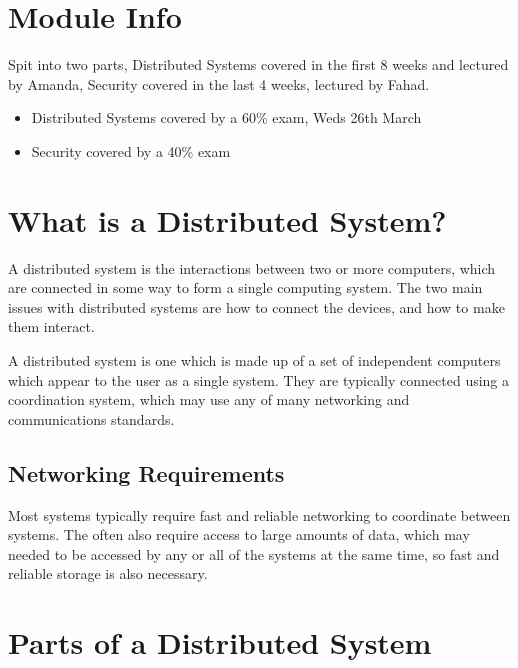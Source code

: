 
\section*{Module Info}

Spit into two parts, Distributed Systems covered in the first 8 weeks and lectured by Amanda, Security covered in the last 4 weeks, lectured by Fahad.

\begin{itemize}
  \item Distributed Systems covered by a 60\% exam, Weds 26th March
  \item Security covered by a 40\% exam
\end{itemize}


\section*{What is a Distributed System?}

A distributed system is the interactions between two or more computers, which are connected in some way to form a single computing system. The two main issues with distributed systems are how to connect the devices, and how to make them interact.

\begin{definition*}{}{}
  A distributed system is one which is made up of a set of independent computers which appear to the user as a single system. They are typically connected using a coordination system, which may use any of many networking and communications standards.
\end{definition*}

\subsection*{Networking Requirements}

Most systems typically require fast and reliable networking to coordinate between systems. The often also require access to large amounts of data, which may needed to be accessed by any or all of the systems at the same time, so fast and reliable storage is also necessary.

\section*{Parts of a Distributed System}

